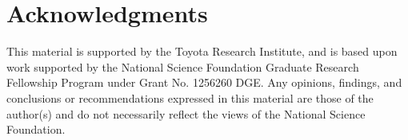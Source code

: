 \documentclass[conference]{IEEEtran}
\begin{document}
\maketitle

\begin{abstract}

\end{abstract}

\IEEEpeerreviewmaketitle







\section*{Acknowledgments}
This material is supported by the Toyota Research Institute, and is based upon work supported by the National Science Foundation Graduate Research Fellowship Program under Grant No. 1256260 DGE. Any opinions, findings, and conclusions or recommendations expressed in this material are those of the author(s) and do not necessarily reflect the views of the National Science Foundation.




\end{document}
